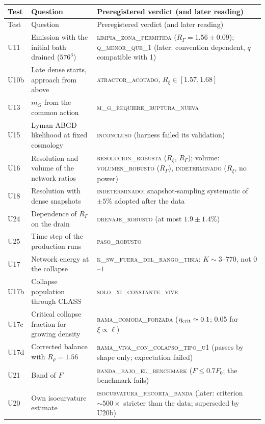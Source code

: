 \documentclass[11pt,a4paper]{article}
\newcommand{\RG}{R_\Gamma}
\newcommand{\Rxi}{R_\xi}
\begin{document}
\begin{small}
\begin{longtable}{L{1.3cm}L{6.0cm}L{7.0cm}}
\toprule
Test & Question & Preregistered verdict (and later reading)\\
\midrule
\endfirsthead
\toprule
Test & Question & Preregistered verdict (and later reading)\\
\midrule
\endhead
\bottomrule
\endfoot
U11 & Emission with the initial bath drained ($576^3$) & \textsc{limpia\_zona\_permitida} ($\RG=1.56\pm0.09$); \textsc{q\_menor\_que\_1} (later: convention dependent, $q$ compatible with 1) \\
U10b & Late dense starts, approach from above & \textsc{atractor\_acotado}, $\Rxi\in[1.57,1.68]$ \\
U13 & $m_G$ from the common action & \textsc{m\_g\_requiere\_ruptura\_nueva} \\
U15 & Lyman-ABGD likelihood at fixed cosmology & \textsc{inconcluso} (harness failed its validation) \\
U16 & Resolution and volume of the network ratios & \textsc{resolucion\_robusta} ($\Rxi$, $\RG$); volume: \textsc{volumen\_robusto} ($\RG$), \textsc{indeterminado} ($\Rxi$, no power) \\
U18 & Resolution with dense snapshots & \textsc{indeterminado}; snapshot-sampling systematic of $\pm5\%$ adopted after the data \\
U24 & Dependence of $\RG$ on the drain & \textsc{drenaje\_robusto} (at most $1.9\pm1.4\%$) \\
U25 & Time step of the production runs & \textsc{paso\_robusto} \\
U17 & Network energy at the collapse & \textsc{k\_sw\_fuera\_del\_rango\_tibia}: $K\sim3$--$770$, not $0$--$1$ \\
U17b & Collapse population through CLASS & \textsc{solo\_xi\_constante\_vive} \\
U17c & Critical collapse fraction for growing density & \textsc{rama\_comoda\_forzada} ($\eta_{\rm crit}\simeq0.1$; 0.05 for $\xi\propto\ell$) \\
U17d & Corrected balance with $R_\rho=1.56$ & \textsc{rama\_viva\_con\_colapso\_tipo\_u1} (passes by shape only; expectation failed) \\
U21 & Band of $F$ & \textsc{banda\_bajo\_el\_benchmark} ($F\le0.7F_0$; the benchmark fails) \\
U20 & Own isocurvature estimate & \textsc{isocurvatura\_recorta\_banda} (later: criterion $\sim500\times$ stricter than the data; superseded by U20b) \\

\end{longtable}
\end{small}
\end{document}
